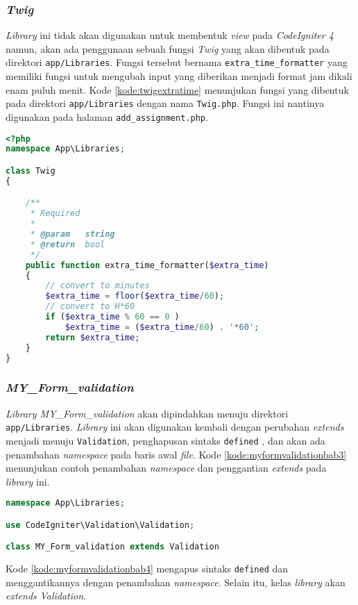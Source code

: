 \subsubsection{\textit{Twig}}
\textit{Library} ini tidak akan digunakan untuk membentuk \textit{view} pada \textit{CodeIgniter 4} namun, akan ada penggunaan sebuah fungsi \textit{Twig} yang akan dibentuk pada direktori \texttt{app/Libraries}. Fungsi tersebut bernama \texttt{extra\_time\_formatter} yang memiliki fungsi untuk mengubah input yang diberikan menjadi format jam dikali enam puluh menit. Kode \ref{kode:twigextratime} menunjukan fungsi yang dibentuk pada direktori \texttt{app/Libraries} dengan nama \texttt{Twig.php}. Fungsi ini nantinya digunakan pada halaman \texttt{add\_assignment.php}.
\begin{lstlisting}[language=PHP, caption=Perancangan perubahan \textit{library MY\_Form\_validation} pada \textit{CodeIgniter 4}, label=kode:twigextratime]
<?php
namespace App\Libraries;

class Twig
{

	/**
	 * Required
	 *
	 * @param	string
	 * @return	bool
	 */
	public function extra_time_formatter($extra_time)
	{
		// convert to minutes
		$extra_time = floor($extra_time/60);
		// convert to H*60
		if ($extra_time % 60 == 0 )
			$extra_time = ($extra_time/60) . '*60';
		return $extra_time;
	}
}

\end{lstlisting}

\subsubsection{\textit{MY\_Form\_validation}}
\textit{Library MY\_Form\_validation} akan dipindahkan menuju direktori \texttt{app/Libraries}. \textit{Library} ini akan digunakan kembali dengan perubahan \textit{extends} menjadi menuju \texttt{Validation}, penghapusan sintaks \texttt{defined} , dan akan ada penambahan \textit{namespace} pada baris awal \textit{file}. Kode \ref{kode:myformvalidationbab3} menunjukan contoh penambahan \textit{namespace} dan penggantian \textit{extends} pada \textit{library} ini.
\begin{lstlisting}[language=PHP, caption=Contoh perubahan \textit{library MY\_Form\_validation} pada \textit{CodeIgniter 4}, label=kode:myformvalidationbab4]
namespace App\Libraries;

use CodeIgniter\Validation\Validation;

class MY_Form_validation extends Validation
\end{lstlisting}
Kode \ref{kode:myformvalidationbab4} mengapus sintaks \texttt{defined} dan menggantikannya dengan penambahan \textit{namespace}. Selain itu, kelas \textit{library} akan \textit{extends} \textit{Validation}. 

